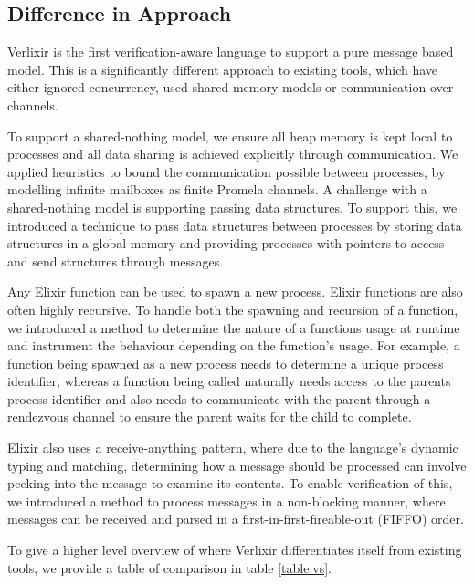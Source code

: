 \subsection{Difference in Approach}
Verlixir is the first verification-aware language to support a pure message based model. This is a significantly different approach to existing tools, which have either ignored concurrency, used shared-memory models or communication over channels. 
\par
To support a shared-nothing model, we ensure all heap memory is kept local to processes and all data sharing is achieved explicitly through communication. We applied heuristics to bound the communication possible between processes, by modelling infinite mailboxes as finite Promela channels. A challenge with a shared-nothing model is supporting passing data structures. To support this, we introduced a technique to pass data structures between processes by storing data structures in a global memory and providing processes with pointers to access and send structures through messages. 
\par
Any Elixir function can be used to spawn a new process. Elixir functions are also often highly recursive. To handle both the spawning and recursion of a function, we introduced a method to determine the nature of a functions usage at runtime and instrument the behaviour depending on the function's usage. For example, a function being spawned as a new process needs to determine a unique process identifier, whereas a function being called naturally needs access to the parents process identifier and also needs to communicate with the parent through a rendezvous channel to ensure the parent waits for the child to complete.
\par
Elixir also uses a receive-anything pattern, where due to the language's dynamic typing and matching, determining how a message should be processed can involve peeking into the message to examine its contents. To enable verification of this, we introduced a method to process messages in a non-blocking manner, where messages can be received and parsed in a first-in-first-fireable-out (FIFFO) order.
\par
To give a higher level overview of where Verlixir differentiates itself from existing tools, we provide a table of comparison in table \ref{table:vs}.

